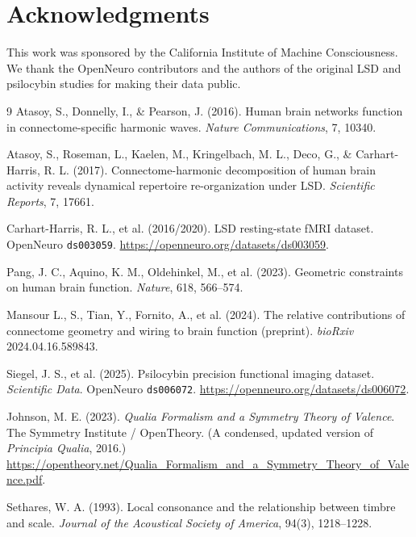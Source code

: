 \documentclass[10pt,a4paper]{article}
\begin{document}
\section*{Acknowledgments}
This work was sponsored by the California Institute of Machine Consciousness. We
thank the OpenNeuro contributors and the authors of the original LSD and
psilocybin studies for making their data public.

\begin{thebibliography}{9}
 Atasoy, S., Donnelly, I., \& Pearson, J. (2016).
Human brain networks function in connectome-specific harmonic waves.
\emph{Nature Communications}, 7, 10340.

 Atasoy, S., Roseman, L., Kaelen, M., Kringelbach, M. L.,
Deco, G., \& Carhart-Harris, R. L. (2017). Connectome-harmonic decomposition of
human brain activity reveals dynamical repertoire re-organization under LSD.
\emph{Scientific Reports}, 7, 17661.

 Carhart-Harris, R. L., et al. (2016/2020).
LSD resting-state fMRI dataset. OpenNeuro \texttt{ds003059}.
\url{https://openneuro.org/datasets/ds003059}.

 Pang, J. C., Aquino, K. M., Oldehinkel, M., et al. (2023).
Geometric constraints on human brain function. \emph{Nature}, 618, 566--574.

 Mansour L., S., Tian, Y., Fornito, A., et al. (2024).
The relative contributions of connectome geometry and wiring to brain function
(preprint). \emph{bioRxiv} 2024.04.16.589843.

 Siegel, J. S., et al. (2025). Psilocybin precision
functional imaging dataset. \emph{Scientific Data}.
OpenNeuro \texttt{ds006072}. \url{https://openneuro.org/datasets/ds006072}.

 Johnson, M. E. (2023). \emph{Qualia Formalism and a
Symmetry Theory of Valence}. The Symmetry Institute / OpenTheory. (A condensed,
updated version of \emph{Principia Qualia}, 2016.)
\url{https://opentheory.net/Qualia_Formalism_and_a_Symmetry_Theory_of_Valence.pdf}.

 Sethares, W. A. (1993). Local consonance and the
relationship between timbre and scale. \emph{Journal of the Acoustical Society of
America}, 94(3), 1218--1228.
\end{thebibliography}
\end{document}
